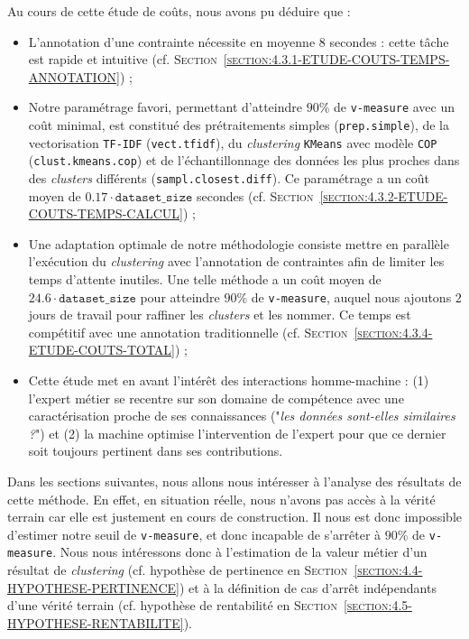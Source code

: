 			\begin{leftBarSummary}
				Au cours de cette étude de coûts, nous avons pu déduire que :
				\begin{itemize}
					\item[\itemok] L'annotation d'une contrainte nécessite en moyenne $8$ secondes : cette tâche est rapide et intuitive (cf. \textsc{Section~\ref{section:4.3.1-ETUDE-COUTS-TEMPS-ANNOTATION}}) ;
					\item[\itemok] Notre paramétrage favori, permettant d'atteindre $90$\% de \texttt{v-measure} avec un coût minimal, est constitué des prétraitements simples (\texttt{prep.simple}), de la vectorisation \texttt{TF-IDF} (\texttt{vect.tfidf}), du \textit{clustering} \texttt{KMeans} avec modèle \texttt{COP} (\texttt{clust.kmeans.cop}) et de l'échantillonnage des données les plus proches dans des \textit{clusters} différents (\texttt{sampl.closest.diff}).
					Ce paramétrage a un coût moyen de $0.17 \cdot \texttt{dataset\_size}$ secondes (cf. \textsc{Section~\ref{section:4.3.2-ETUDE-COUTS-TEMPS-CALCUL}}) ;
					\item[\itemok] Une adaptation optimale de notre méthodologie consiste mettre en parallèle l'exécution du \textit{clustering} avec l'annotation de contraintes afin de limiter les temps d'attente inutiles.
					Une telle méthode a un coût moyen de $24.6 \cdot \texttt{dataset\_size}$ pour atteindre $90$\% de \texttt{v-measure}, auquel nous ajoutons $2$ jours de travail pour raffiner les \textit{clusters} et les nommer.
					Ce temps est compétitif avec une annotation traditionnelle (cf. \textsc{Section~\ref{section:4.3.4-ETUDE-COUTS-TOTAL}}) ;
					\item[\itemok] Cette étude met en avant l'intérêt des interactions homme-machine : (1) l'expert métier se recentre sur son domaine de compétence avec une caractérisation proche de ses connaissances ("\textit{les données sont-elles similaires ?}") et (2) la machine optimise l'intervention de l'expert pour que ce dernier soit toujours pertinent dans ses contributions.
				\end{itemize}
			\end{leftBarSummary}
		
		Dans les sections suivantes, nous allons nous intéresser à l'analyse des résultats de cette méthode.
		En effet, en situation réelle, nous n'avons pas accès à la vérité terrain car elle est justement en cours de construction.
		Il nous est donc impossible d'estimer notre seuil de \texttt{v-measure}, et donc incapable de s'arrêter à $90$\% de \texttt{v-measure}.
		Nous nous intéressons donc à l'estimation de la valeur métier d'un résultat de \textit{clustering} (cf. hypothèse de pertinence en \textsc{Section~\ref{section:4.4-HYPOTHESE-PERTINENCE}}) et à la définition de cas d'arrêt indépendants d'une vérité terrain (cf. hypothèse de rentabilité en \textsc{Section~\ref{section:4.5-HYPOTHESE-RENTABILITE}}).